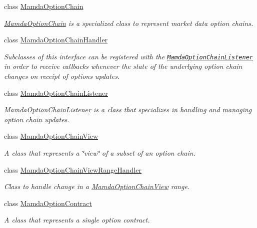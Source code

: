 \begin{CompactItemize}
class \hyperlink{classWombat_1_1MamdaOptionChain}{Mamda\-Option\-Chain}
\begin{CompactList}\small\item\em \hyperlink{classWombat_1_1MamdaOptionChain}{Mamda\-Option\-Chain} is a specialized class to represent market data option chains. \item\end{CompactList}\item 
class \hyperlink{classWombat_1_1MamdaOptionChainHandler}{Mamda\-Option\-Chain\-Handler}
\begin{CompactList}\small\item\em Subclasses of this interface can be registered with the {\tt \hyperlink{classWombat_1_1MamdaOptionChainListener}{Mamda\-Option\-Chain\-Listener}} in order to receive callbacks whenever the state of the underlying option chain changes on receipt of options updates. \item\end{CompactList}\item 
class \hyperlink{classWombat_1_1MamdaOptionChainListener}{Mamda\-Option\-Chain\-Listener}
\begin{CompactList}\small\item\em \hyperlink{classWombat_1_1MamdaOptionChainListener}{Mamda\-Option\-Chain\-Listener} is a class that specializes in handling and managing option chain updates. \item\end{CompactList}\item 
class \hyperlink{classWombat_1_1MamdaOptionChainView}{Mamda\-Option\-Chain\-View}
\begin{CompactList}\small\item\em A class that represents a \char`\"{}view\char`\"{} of a subset of an option chain. \item\end{CompactList}\item 
class \hyperlink{classWombat_1_1MamdaOptionChainViewRangeHandler}{Mamda\-Option\-Chain\-View\-Range\-Handler}
\begin{CompactList}\small\item\em Class to handle change in a \hyperlink{classWombat_1_1MamdaOptionChainView}{Mamda\-Option\-Chain\-View} range. \item\end{CompactList}\item 
class \hyperlink{classWombat_1_1MamdaOptionContract}{Mamda\-Option\-Contract}
\begin{CompactList}\small\item\em A class that represents a single option contract. \item\end{CompactList}\item 

\end{CompactItemize}

